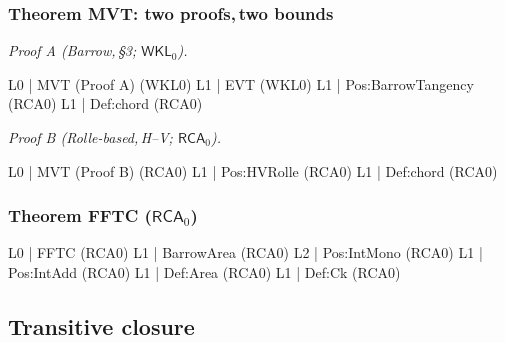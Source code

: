 \documentclass[11pt,reqno]{amsart}
\theoremstyle{redplain}
\begin{document}
\subsubsection*{Theorem \textsf{MVT}: two proofs,\,\allowbreak two bounds}

\noindent\emph{Proof A (Barrow,\,\allowbreak \S 3; $\mathsf{WKL}_0$).} 
\begin{verbatimbox}
	L0 | MVT (Proof A)                    (WKL0)
	L1 |   EVT                            (WKL0)
	L1 |   Pos:BarrowTangency             (RCA0)
	L1 |   Def:chord                      (RCA0)
\end{verbatimbox}
\emph{Proof B (Rolle-based,\,\allowbreak H--V; $\mathsf{RCA}_0$).} 
\begin{verbatimbox}
	L0 | MVT (Proof B)                    (RCA0)
	L1 |   Pos:HVRolle                    (RCA0)
	L1 |   Def:chord                      (RCA0)
\end{verbatimbox}

\subsubsection*{Theorem \textsf{FFTC} ($\mathsf{RCA}_0$)}

\begin{verbatimbox}
	L0 | FFTC                             (RCA0)
	L1 |   BarrowArea                     (RCA0)
	L2 |     Pos:IntMono                  (RCA0)
	L1 |   Pos:IntAdd                     (RCA0)
	L1 |   Def:Area                       (RCA0)
	L1 |   Def:Ck                         (RCA0)
\end{verbatimbox}

\subsection{Transitive closure}
\end{document}
